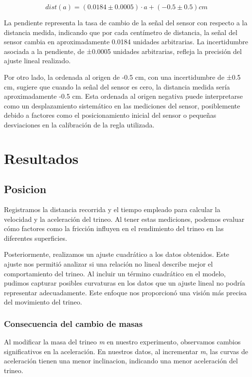 \documentclass[12pt,a4]{article}
\begin{document}
\begin{equation}
    dist(a) = (0.0184 \pm 0.0005) \cdot a + (-0.5 \pm 0.5) cm
    \label{eq:dist}
\end{equation}

La pendiente representa la tasa de cambio de la señal del sensor con respecto a la distancia medida, indicando que por cada centímetro de distancia, la señal del sensor cambia en
 aproximadamente 0.0184 unidades arbitrarias. La incertidumbre asociada a la pendiente, de ±0.0005 unidades arbitrarias, refleja la precisión del ajuste lineal realizado.


Por otro lado, la ordenada al origen de -0.5 cm, con una incertidumbre de ±0.5 cm, sugiere que cuando la señal del sensor es cero, la distancia medida sería aproximadamente -0.5 cm.
 Esta ordenada al origen negativa puede interpretarse como un desplazamiento sistemático en las mediciones del sensor, posiblemente debido a factores como el posicionamiento inicial 
 del sensor o pequeñas desviaciones en la calibración de la regla utilizada.

\section{Resultados}

\subsection{Posicion}

Registramos la distancia recorrida y el tiempo empleado para calcular la velocidad y la aceleración del trineo. Al tener estas mediciones, podemos evaluar cómo factores como la
 fricción influyen en el rendimiento del trineo en las diferentes superficies.

Posteriormente, realizamos un ajuste cuadrático a los datos obtenidos. Este ajuste nos permitió analizar si una relación no lineal describe mejor el comportamiento del trineo.
 Al incluir un término cuadrático en el modelo, pudimos capturar posibles curvaturas en los datos que un ajuste lineal no podría representar adecuadamente. Este enfoque nos
  proporcionó una visión más precisa del movimiento del trineo.

\subsubsection*{Consecuencia del cambio de masas}

Al modificar la masa del trineo \textit{m} en nuestro experimento, observamos cambios significativos en la aceleración. En nuestros datos, al incrementar \textit{m}, las curvas de aceleración tienen una menor inclinacion, indicando una menor aceleración del trineo.
\end{document}
